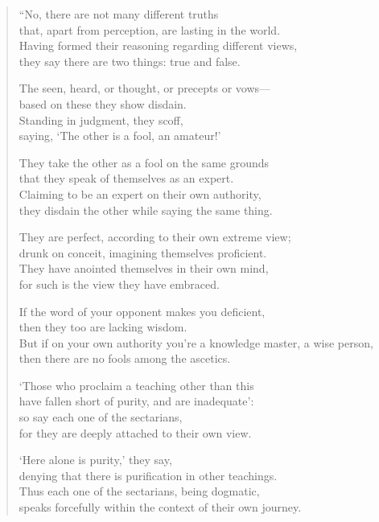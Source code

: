 \documentclass[12pt,openany]{book}%
\begin{document}
\begin{verse}
“No, there are not many different truths \\
that, apart from perception, are lasting in the world. \\
Having formed their reasoning regarding different views, \\
they say there are two things: true and false. 

The seen, heard, or thought, or precepts or vows— \\
based on these they show disdain. \\
Standing in judgment, they scoff, \\
saying, ‘The other is a fool, an amateur!’ 

They take the other as a fool on the same grounds \\
that they speak of themselves as an expert. \\
Claiming to be an expert on their own authority, \\
they disdain the other while saying the same thing. 

They are perfect, according to their own extreme view; \\
drunk on conceit, imagining themselves proficient. \\
They have anointed themselves in their own mind, \\
for such is the view they have embraced. 

If the word of your opponent makes you deficient, \\
then they too are lacking wisdom. \\
But if on your own authority you’re a knowledge master, a wise person, \\
then there are no fools among the ascetics. 

‘Those who proclaim a teaching other than this \\
have fallen short of purity, and are inadequate’: \\
so say each one of the sectarians, \\
for they are deeply attached to their own view. 

‘Here alone is purity,’ they say, \\
denying that there is purification in other teachings. \\
Thus each one of the sectarians, being dogmatic, \\
speaks forcefully within the context of their own journey. 


\end{verse}
\end{document}
